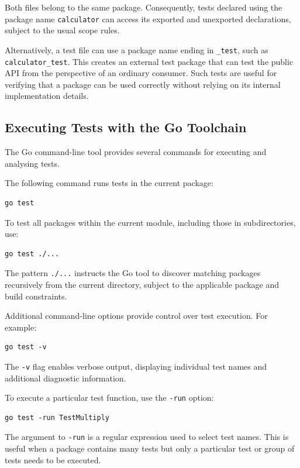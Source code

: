 Both files belong to the same package. Consequently, tests declared using the package name \texttt{calculator} can access its exported and unexported declarations, subject to the usual scope rules.

Alternatively, a test file can use a package name ending in \texttt{\_test}, such as \texttt{calculator\_test}. This creates an external test package that can test the public API from the perspective of an ordinary consumer. Such tests are useful for verifying that a package can be used correctly without relying on its internal implementation details.

\subsection{Executing Tests with the Go Toolchain}

The Go command-line tool provides several commands for executing and analysing tests.

The following command runs tests in the current package:

\begin{lstlisting}
go test
\end{lstlisting}

To test all packages within the current module, including those in subdirectories, use:

\begin{lstlisting}
go test ./...
\end{lstlisting}

The pattern \texttt{./...} instructs the Go tool to discover matching packages recursively from the current directory, subject to the applicable package and build constraints.

Additional command-line options provide control over test execution. For example:

\begin{lstlisting}
go test -v
\end{lstlisting}

The \texttt{-v} flag enables verbose output, displaying individual test names and additional diagnostic information.

To execute a particular test function, use the \texttt{-run} option:

\begin{lstlisting}
go test -run TestMultiply
\end{lstlisting}

The argument to \texttt{-run} is a regular expression used to select test names. This is useful when a package contains many tests but only a particular test or group of tests needs to be executed.

